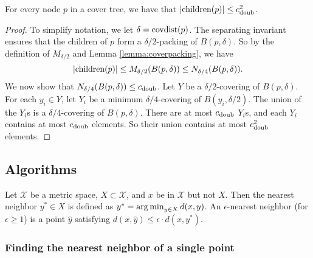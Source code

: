 \documentclass[../main.tex]{subfiles}
\newcommand{\set}[1]{\mathcal {#1}}
\newcommand{\dist}[2]{\distf({#1},{#2})}
\newcommand{\distf}{d}
\newcommand{\doubnum}{c_\textnormal{doub}}
\newcommand{\p}{\ensuremath p}
\newcommand{\mkfunction}[1]{\ifmmode{\text{{#1}}}}
\newcommand{\children}[1]   {\mkfunction{children}({#1})}
\newcommand{\covdist}[1]    {\mkfunction{covdist}({#1})}
\begin{document}

\begin{lemma}
    \label{lemma:children}
    For every node $p$ in a cover tree, we have that
    $|\children\p| \le \doubnum^2$.
\end{lemma}

\begin{proof}
    To simplify notation, we let $\delta=\covdist{p}$.
    The separating invariant ensures that the children of $p$ form a $\delta/2$-packing of $B(p,\delta)$.
    So by the definition of $M_{\delta/2}$ and Lemma \ref{lemma:coverpacking}, we have
    \begin{equation}
        |\children{p}| 
        \le M_{\delta/2}(B(p,\delta)) 
        \le N_{\delta/4}(B(p,\delta)) 
        .
    \end{equation}
    We now show that $N_{\delta/4}(B(p,\delta))\le\doubnum$.
    Let $Y$ be a $\delta/2$-covering of $B(p,\delta)$.
    For each $y_i\in Y$, let $Y_i$ be a minimum $\delta/4$-covering of $B(y_i,\delta/2)$.
    The union of the $Y_i$s is a $\delta/4$-covering of $B(p,\delta)$.
    There are at most $\doubnum$ $Y_i$s, and each $Y_i$ contains at most $\doubnum$ elements.
    So their union contains at most $\doubnum^2$ elements.
\end{proof}


\subsection{Algorithms}


\begin{definition}
    Let $\set X$ be a metric space, $X\subset\set X$, and $x$ be in $\set X$ but not $X$.
    Then the nearest neighbor $y^*\in X$ is defined as $y^*=\argmin_{y\in X} \dist{x}{y}$.
    An $\epsilon$-nearest neighbor (for $\epsilon\ge1$) is a point $\hat y$ satisfying $\dist{x}{\hat y} \le \epsilon \cdot\dist{x}{y^*}$.
\end{definition}
\newcommand{\eann}{\varepsilon\text{-ann}}

\subsubsection{Finding the nearest neighbor of a single point}
\end{document}
